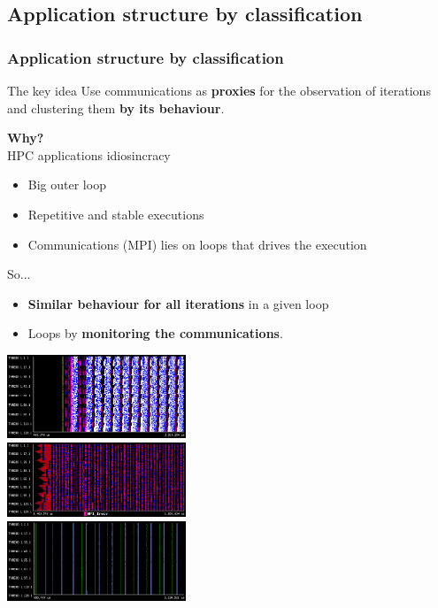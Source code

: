 \documentclass{beamer}
\begin{document}
\subsection{Application structure by classification}
\begin{frame}
\frametitle{Application structure by classification}
\begin{block}{The key idea}
	Use communications as \textbf{proxies} for the observation of iterations and clustering them \textbf{by its behaviour}.
\end{block}
\pause
\begin{multicols}{2}
	
\textbf{Why?}\\
HPC applications idiosincracy\\
\begin{itemize}
	\item Big outer loop
	\item Repetitive and stable executions
	\item Communications (MPI) lies on loops that drives the execution
\end{itemize}
So...\\
\begin{itemize}
	\item \textbf{Similar behaviour for all iterations} in a given loop
	\item Loops by \textbf{monitoring the communications}.
\end{itemize}
\columnbreak


\includegraphics[width=0.4\textwidth,height=0.2\textheight]{imgs/lu_trace_128.png}\\
\includegraphics[width=0.4\textwidth,height=0.2\textheight]{imgs/cg_trace_128.png}\\
\includegraphics[width=0.4\textwidth,height=0.2\textheight]{imgs/ft_trace_128.png}

\vfill
\end{multicols}
\end{frame}
\end{document}

